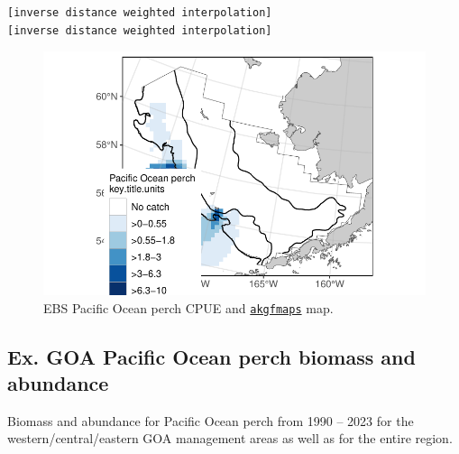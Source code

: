 \documentclass[
  letterpaper,
  oneside,
  open=any]{scrbook}
\newenvironment{Shaded}{\begin{snugshade}}{\end{snugshade}}
\newcommand{\NormalTok}[1]{\textcolor[rgb]{0.00,0.23,0.31}{#1}}
\newcommand{\SpecialCharTok}[1]{\textcolor[rgb]{0.37,0.37,0.37}{#1}}
\begin{document}
\begin{verbatim}
[inverse distance weighted interpolation]
[inverse distance weighted interpolation]
\end{verbatim}

\begin{Shaded}
\end{Shaded}

\begin{figure}[H]

{\centering \includegraphics{content/akfin-oracle-sql-r_files/figure-pdf/test-6-fig-1.pdf}

}

\caption{EBS Pacific Ocean perch CPUE and
\href{https://github.com/afsc-gap-products/akgfmaps}{\texttt{akgfmaps}}
map.}

\end{figure}%

\subsection{Ex. GOA Pacific Ocean perch biomass and
abundance}\label{ex.-goa-pacific-ocean-perch-biomass-and-abundance}

Biomass and abundance for Pacific Ocean perch from 1990 -- 2023 for the
western/central/eastern GOA management areas as well as for the entire
region.
\end{document}
